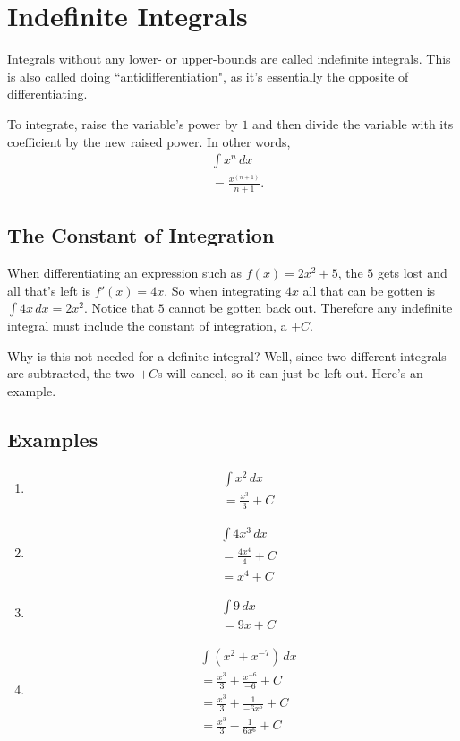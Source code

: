 \section{Indefinite Integrals}
Integrals without any lower- or upper-bounds are called indefinite integrals. This is also called doing ``antidifferentiation", as it's essentially the opposite of differentiating.

To integrate, raise the variable's power by $1$ and then divide the variable with its coefficient by the new raised power. In other words,
\begin{align*}
	&\int x^n \, dx\\
	&= \frac{x^{(n+1)}}{n+1}\text{.}
\end{align*}

\subsection{The Constant of Integration}
When differentiating an expression such as $f(x) = 2x^2+5$, the $5$ gets lost and all that's left is $f'(x) = 4x$. So when integrating $4x$ all that can be gotten is $\int 4x \, dx = 2x^2$. Notice that $5$ cannot be gotten back out. Therefore any indefinite integral must include the constant of integration, a $+C$.

Why is this not needed for a definite integral? Well, since two different integrals are subtracted, the two $+C$s will cancel, so it can just be left out. Here's an example.

\subsection{Examples}
\begin{enumerate}
	\item
	\begin{align*}
		&\int x^2 \, dx\\
		&= \frac{x^3}{3} + C
	\end{align*}
	
	\item
	\begin{align*}
		&\int 4x^3 \, dx\\
		&= \frac{4x^4}{4} + C\\
		&= x^4+C
	\end{align*}
	
	\item
	\begin{align*}
		&\int 9 \, dx\\
		&= 9x + C
	\end{align*}
	
	\item
	\begin{align*}
		&\int \left(x^2+x^{-7}\right) \, dx\\
		&= \frac{x^3}{3} + \frac{x^{-6}}{-6} + C\\
		&= \frac{x^3}{3} + \frac{1}{-6x^6} + C\\
		&= \frac{x^3}{3} - \frac{1}{6x^6} + C
	\end{align*}
\end{enumerate}


